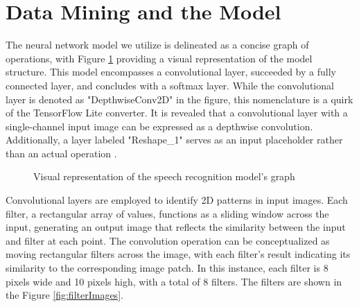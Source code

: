 \section{Data Mining and the Model}

The neural network model we utilize is delineated as a concise graph of operations, with Figure \ref{fig:SpeechRecognitionModelGraph} providing a visual representation of the model structure. This model encompasses a convolutional layer, succeeded by a fully connected layer, and concludes with a softmax layer. While the convolutional layer is denoted as "DepthwiseConv2D" in the figure, this nomenclature is a quirk of the TensorFlow Lite converter. It is revealed that a convolutional layer with a single-channel input image can be expressed as a depthwise convolution. Additionally, a layer labeled "Reshape\_1" serves as an input placeholder rather than an actual operation \cite{Warden:2019}.


\begin{figure}[h!]
	\centering
	
	\caption{Visual representation of the speech recognition model's graph} \label{fig:SpeechRecognitionModelGraph}
\end{figure}


Convolutional layers are employed to identify 2D patterns in input images. Each filter, a rectangular array of values, functions as a sliding window across the input, generating an output image that reflects the similarity between the input and filter at each point. The convolution operation can be conceptualized as moving rectangular filters across the image, with each filter's result indicating its similarity to the corresponding image patch. In this instance, each filter is 8 pixels wide and 10 pixels high, with a total of 8 filters. The filters are shown in the Figure \ref{fig:filterImages}.

